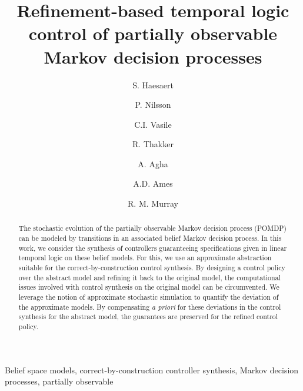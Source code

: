 \documentclass{ifacconf}
\begin{document}
\begin{frontmatter}

\title{\huge Refinement-based temporal logic control of partially observable Markov decision processes }

\author[cal]{S. Haesaert} 
\author[cal]{P. Nilsson} 
\author[mit]{C.I. Vasile}
\author[jpl]{R. Thakker}
\author[jpl]{A. Agha}
\author[cal]{A.D.  Ames}
\author[cal]{R. M. Murray}



\address[cal]{California Institute of Technology, 
   Pasadena, CA 91125 USA} %
\address[mit]{Massachusetts Institute of Technology, 
   Cambridge, MA 02139 USA}%
\address[jpl]{Jet Propulsion Laboratory, 
   Pasadena, CA 91109 USA}%
\maketitle
\begin{abstract}
The stochastic evolution of the partially observable Markov decision process (POMDP) can be modeled by transitions in an associated belief Markov decision process.
In this work, we consider the synthesis of controllers guaranteeing  specifications given in linear temporal logic on these belief models.
For this, we use an approximate  abstraction %
 suitable for the correct-by-construction control synthesis. By designing a control policy over the abstract model and refining it back to the original model, the computational issues involved with control synthesis on the original model can be circumvented. 
We leverage the notion of approximate stochastic simulation to quantify the deviation of the approximate models.  %
By compensating {\it a priori} for these deviations in the control synthesis for the abstract model, the guarantees are preserved for the refined control policy.
\end{abstract}
\begin{keyword} Belief space models,
correct-by-construction controller synthesis, Markov decision processes, partially observable
\end{keyword}

\end{frontmatter}
 
\end{document}
